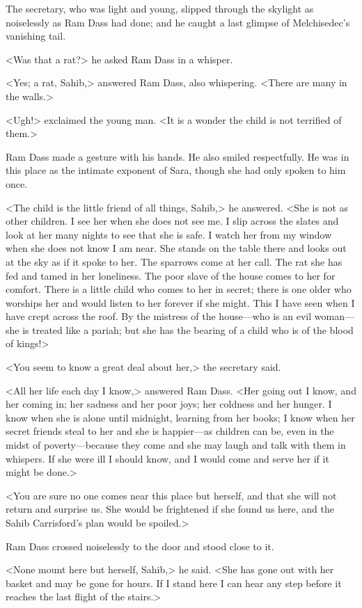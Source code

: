 The secretary, who was light and young, slipped through the skylight as noiselessly as Ram Dass had done; and he caught a last glimpse of Melchisedec's vanishing tail.

<Was that a rat?> he asked Ram Dass in a whisper.

<Yes; a rat, Sahib,> answered Ram Dass, also whispering. <There are many in the walls.>

<Ugh!> exclaimed the young man. <It is a wonder the child is not terrified of them.>

Ram Dass made a gesture with his hands. He also smiled respectfully. He was in this place as the intimate exponent of Sara, though she had only spoken to him once.

<The child is the little friend of all things, Sahib,> he answered. <She is not as other children. I see her when she does not see me. I slip across the slates and look at her many nights to see that she is safe. I watch her from my window when she does not know I am near. She stands on the table there and looks out at the sky as if it spoke to her. The sparrows come at her call. The rat she has fed and tamed in her loneliness. The poor slave of the house comes to her for comfort. There is a little child who comes to her in secret; there is one older who worships her and would listen to her forever if she might. This I have seen when I have crept across the roof. By the mistress of the house—who is an evil woman—she is treated like a pariah; but she has the bearing of a child who is of the blood of kings!>

<You seem to know a great deal about her,> the secretary said.

<All her life each day I know,> answered Ram Dass. <Her going out I know, and her coming in; her sadness and her poor joys; her coldness and her hunger. I know when she is alone until midnight, learning from her books; I know when her secret friends steal to her and she is happier—as children can be, even in the midst of poverty—because they come and she may laugh and talk with them in whispers. If she were ill I should know, and I would come and serve her if it might be done.>

<You are sure no one comes near this place but herself, and that she will not return and surprise us. She would be frightened if she found us here, and the Sahib Carrisford's plan would be spoiled.>

Ram Dass crossed noiselessly to the door and stood close to it.

<None mount here but herself, Sahib,> he said. <She has gone out with her basket and may be gone for hours. If I stand here I can hear any step before it reaches the last flight of the stairs.>

